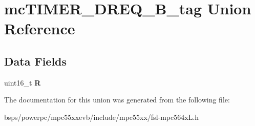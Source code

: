 \hypertarget{unionmcTIMER__DREQ__16B__tag}{}\section{mc\+T\+I\+M\+E\+R\+\_\+\+D\+R\+E\+Q\+\_\+B\+\_\+tag Union Reference}
\label{unionmcTIMER__DREQ__16B__tag}
\subsection*{Data Fields}
\begin{DoxyCompactItemize}
\item 
\mbox{\label{unionmcTIMER__DREQ__16B__tag_a7fba31b28f164c92c673284c76cb0052}} 
uint16\+\_\+t {\bfseries R}
\end{DoxyCompactItemize}


The documentation for this union was generated from the following file\+:\begin{DoxyCompactItemize}
\item 
bsps/powerpc/mpc55xxevb/include/mpc55xx/fsl-\/mpc564x\+L.\+h\end{DoxyCompactItemize}
